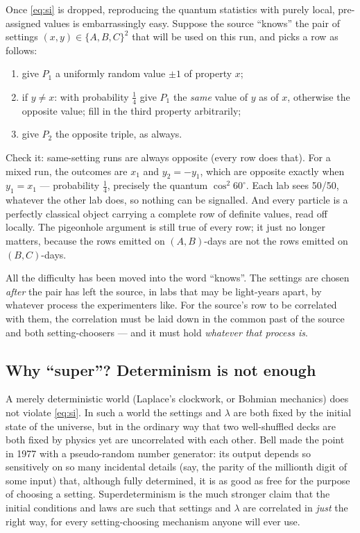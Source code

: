 \documentclass[11pt,a4paper]{article}
\theoremstyle{remark}
\begin{document}
Once \eqref{eq:si} is dropped, reproducing the quantum statistics with purely
local, pre-assigned values is embarrassingly easy. Suppose the source ``knows''
the pair of settings $(x,y)\in\{A,B,C\}^2$ that will be used on this run, and
picks a row as follows:
\begin{enumerate}[nosep]
 \item give $P_1$ a uniformly random value $\pm1$ of property $x$;
 \item if $y\neq x$: with probability $\tfrac14$ give $P_1$ the \emph{same} value
       of $y$ as of $x$, otherwise the opposite value; fill in the third
       property arbitrarily;
 \item give $P_2$ the opposite triple, as always.
\end{enumerate}
Check it: same-setting runs are always opposite (every row does that). For a
mixed run, the outcomes are $x_1$ and $y_2 = -y_1$, which are opposite exactly
when $y_1 = x_1$ --- probability $\tfrac14$, precisely the quantum
$\cos^2 60^\circ$. Each lab sees 50/50, whatever the other lab does, so nothing
can be signalled. And every particle is a perfectly classical object carrying a
complete row of definite values, read off locally. The pigeonhole argument is
still true of every row; it just no longer matters, because the rows emitted on
$(A,B)$-days are not the rows emitted on $(B,C)$-days.

All the difficulty has been moved into the word ``knows''. The settings are
chosen \emph{after} the pair has left the source, in labs that may be light-years
apart, by whatever process the experimenters like. For the source's row to be
correlated with them, the correlation must be laid down in the common past of the
source and both setting-choosers --- and it must hold \emph{whatever that
process is}.

\subsection{Why ``super''? Determinism is not enough}

A merely deterministic world (Laplace's clockwork, or Bohmian mechanics) does
not violate \eqref{eq:si}. In such a world the settings and $\lambda$ are both
fixed by the initial state of the universe, but in the ordinary way that two
well-shuffled decks are both fixed by physics yet are uncorrelated with each
other. Bell made the point in 1977 with a pseudo-random number generator: its
output depends so sensitively on so many incidental details (say, the parity of
the millionth digit of some input) that, although fully determined, it is as
good as free for the purpose of choosing a setting. Superdeterminism is the much
stronger claim that the initial conditions and laws are such that settings and
$\lambda$ are correlated in \emph{just} the right way, for every
setting-choosing mechanism anyone will ever use.
\end{document}
